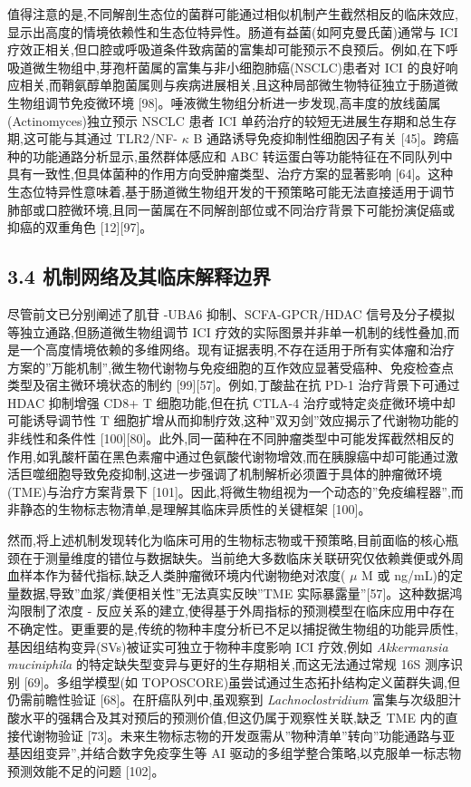 \documentclass[11pt]{article}
\begin{document}
值得注意的是,不同解剖生态位的菌群可能通过相似机制产生截然相反的临床效应,显示出高度的情境依赖性和生态位特异性。肠道有益菌(如阿克曼氏菌)通常与 ICI 疗效正相关,但口腔或呼吸道条件致病菌的富集却可能预示不良预后。例如,在下呼吸道微生物组中,芽孢杆菌属的富集与非小细胞肺癌(NSCLC)患者对 ICI 的良好响应相关,而鞘氨醇单胞菌属则与疾病进展相关,且这种局部微生物特征独立于肠道微生物组调节免疫微环境 {[}98{]}。唾液微生物组分析进一步发现,高丰度的放线菌属(Actinomyces)独立预示 NSCLC 患者 ICI 单药治疗的较短无进展生存期和总生存期,这可能与其通过 TLR2/NF- \(\kappa\) B 通路诱导免疫抑制性细胞因子有关 {[}45{]}。跨癌种的功能通路分析显示,虽然群体感应和 ABC 转运蛋白等功能特征在不同队列中具有一致性,但具体菌种的作用方向受肿瘤类型、治疗方案的显著影响 {[}64{]}。这种生态位特异性意味着,基于肠道微生物组开发的干预策略可能无法直接适用于调节肺部或口腔微环境,且同一菌属在不同解剖部位或不同治疗背景下可能扮演促癌或抑癌的双重角色 {[}12{]}{[}97{]}。

\subsection{3.4 机制网络及其临床解释边界}\label{ux673aux5236ux7f51ux7edcux53caux5176ux4e34ux5e8aux89e3ux91caux8fb9ux754c}

尽管前文已分别阐述了肌苷 -UBA6 抑制、SCFA-GPCR/HDAC 信号及分子模拟等独立通路,但肠道微生物组调节 ICI 疗效的实际图景并非单一机制的线性叠加,而是一个高度情境依赖的多维网络。现有证据表明,不存在适用于所有实体瘤和治疗方案的''万能机制'',微生物代谢物与免疫细胞的互作效应显著受癌种、免疫检查点类型及宿主微环境状态的制约 {[}99{]}{[}57{]}。例如,丁酸盐在抗 PD-1 治疗背景下可通过 HDAC 抑制增强 CD8+ T 细胞功能,但在抗 CTLA-4 治疗或特定炎症微环境中却可能诱导调节性 T 细胞扩增从而抑制疗效,这种''双刃剑''效应揭示了代谢物功能的非线性和条件性 {[}100{]}{[}80{]}。此外,同一菌种在不同肿瘤类型中可能发挥截然相反的作用,如乳酸杆菌在黑色素瘤中通过色氨酸代谢物增效,而在胰腺癌中却可能通过激活巨噬细胞导致免疫抑制,这进一步强调了机制解析必须置于具体的肿瘤微环境(TME)与治疗方案背景下 {[}101{]}。因此,将微生物组视为一个动态的''免疫编程器'',而非静态的生物标志物清单,是理解其临床异质性的关键框架 {[}100{]}。

然而,将上述机制发现转化为临床可用的生物标志物或干预策略,目前面临的核心瓶颈在于测量维度的错位与数据缺失。当前绝大多数临床关联研究仅依赖粪便或外周血样本作为替代指标,缺乏人类肿瘤微环境内代谢物绝对浓度( \(\mu\) M 或 ng/mL)的定量数据,导致''血浆/粪便相关性''无法真实反映''TME 实际暴露量''{[}57{]}。这种数据鸿沟限制了浓度 - 反应关系的建立,使得基于外周指标的预测模型在临床应用中存在不确定性。更重要的是,传统的物种丰度分析已不足以捕捉微生物组的功能异质性,基因组结构变异(SVs)被证实可独立于物种丰度影响 ICI 疗效,例如 \emph{Akkermansia muciniphila} 的特定缺失型变异与更好的生存期相关,而这无法通过常规 16S 测序识别 {[}69{]}。多组学模型(如 TOPOSCORE)虽尝试通过生态拓扑结构定义菌群失调,但仍需前瞻性验证 {[}68{]}。在肝癌队列中,虽观察到 \emph{Lachnoclostridium} 富集与次级胆汁酸水平的强耦合及其对预后的预测价值,但这仍属于观察性关联,缺乏 TME 内的直接代谢物验证 {[}73{]}。未来生物标志物的开发亟需从''物种清单''转向''功能通路与亚基因组变异'',并结合数字免疫孪生等 AI 驱动的多组学整合策略,以克服单一标志物预测效能不足的问题 {[}102{]}。
\end{document}

